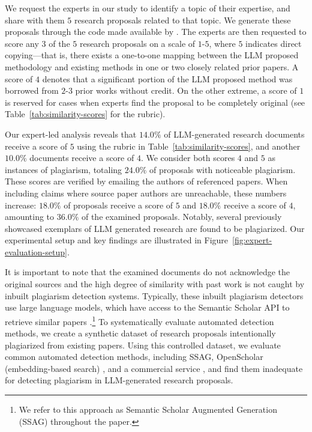 We request 
the experts in our study 
to identify a topic of their expertise, 
and 
share with
them $5$ 
research proposals 
related to that topic. 
We 
generate these proposals through 
the code made available by \citet{si2024can}. 
The experts are then requested 
to score any $3$ of the 
$5$ research proposals 
on a  
scale of $1$-$5$, 
where $5$ indicates 
direct 
copying---that is, there exists 
a one-to-one mapping 
between the LLM proposed methodology
and existing methods 
in one or two closely related prior papers.
A score of $4$ 
denotes that 
a significant portion of the LLM proposed method
was borrowed from $2$-$3$ prior works without credit.
On the other extreme, 
a score of $1$ is reserved 
for cases when 
experts 
find the proposal to be completely original
(see Table~\ref{tab:similarity-scores}
for the rubric).



Our expert-led analysis reveals that $14.0\%$ of LLM-generated research documents 
receive a score of $5$ using the rubric in Table~\ref{tab:similarity-scores}, and another $10.0\%$ 
documents receive a score of $4$. 
We consider both scores $4$ and $5$ as instances of plagiarism, 
totaling $24.0\%$ of proposals with noticeable plagiarism. 
These scores are verified by emailing the authors of referenced papers. 
When including claims where source paper authors are unreachable, 
these numbers increase: $18.0\%$ of proposals receive a score of $5$ and $18.0\%$ receive a score of $4$, 
amounting to $36.0\%$ of the examined proposals.
Notably, several
previously 
showcased exemplars of LLM generated research \citep{si2024can,lu2024ai}
are found to be plagiarized.
Our experimental setup 
and key findings 
are illustrated in Figure~\ref{fig:expert-evaluation-setup}.


It is important to note 
that the examined documents
do not 
acknowledge the original sources
and the high degree of 
similarity with past 
work 
is not caught by 
inbuilt plagiarism detection systems.
Typically,  
these inbuilt plagiarism detectors 
use large language models,  
which have access 
to the Semantic Scholar API 
to retrieve similar papers
\citep{si2024can, lu2024ai, li2024chain}.\footnote{We refer to this approach as Semantic Scholar Augmented Generation (SSAG) throughout the paper.}
To systematically evaluate automated detection methods, 
we create a synthetic dataset of 
research proposals intentionally plagiarized from existing papers.
Using this controlled dataset, 
we evaluate common automated detection methods, 
including SSAG, OpenScholar (embedding-based search) \citep{asai2024openscholar}, and a
commercial service \citep{turnitin}, and find them inadequate for detecting plagiarism in LLM-generated research proposals.




